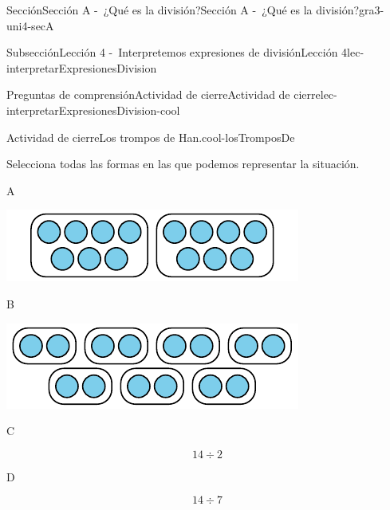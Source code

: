 \begin{sectionptx}{Sección}{Sección A -~¿Qué es la división?}{}{Sección A -~¿Qué es la división?}{}{}{gra3-uni4-secA}
\begin{subsectionptx}{Subsección}{Lección 4 -~Interpretemos expresiones de división}{}{Lección 4}{}{}{lec-interpretarExpresionesDivision}
\begin{reading-questions-subsubsection-numberless}{Preguntas de comprensión}{Actividad de cierre}{}{Actividad de cierre}{}{}{lec-interpretarExpresionesDivision-cool}
\begin{project}{Actividad de cierre}{Los trompos de Han.}{cool-losTromposDe}
\par
Selecciona \alert{todas} las formas en las que podemos representar la situación.%
\begin{sidebyside}{4}{0.0075}{0.0075}{0.015}%
\begin{sbspanel}{0.04}%
A%
\end{sbspanel}%
\begin{sbspanel}{0.43}%
\includegraphics[max width=\linewidth, center]{external/svg-source/tikz-file-151100.pdf}
\end{sbspanel}%
\begin{sbspanel}{0.04}%
B%
\end{sbspanel}%
\begin{sbspanel}{0.43}%
\includegraphics[max width=\linewidth, center]{external/svg-source/tikz-file-151101.pdf}
\end{sbspanel}%
\end{sidebyside}%
\begin{sidebyside}{4}{0.0075}{0.0075}{0.015}%
\begin{sbspanel}{0.04}%
C%
\end{sbspanel}%
\begin{sbspanel}{0.43}%
\par
%
\begin{equation*}
14\div 2
\end{equation*}
%
\end{sbspanel}%
\begin{sbspanel}{0.04}%
\par
D%
\end{sbspanel}%
\begin{sbspanel}{0.43}%
\par
%
\begin{equation*}
14\div 7
\end{equation*}

\end{sbspanel}
\end{sidebyside}
\end{project}
\end{reading-questions-subsubsection-numberless}
\end{subsectionptx}
\end{sectionptx}
